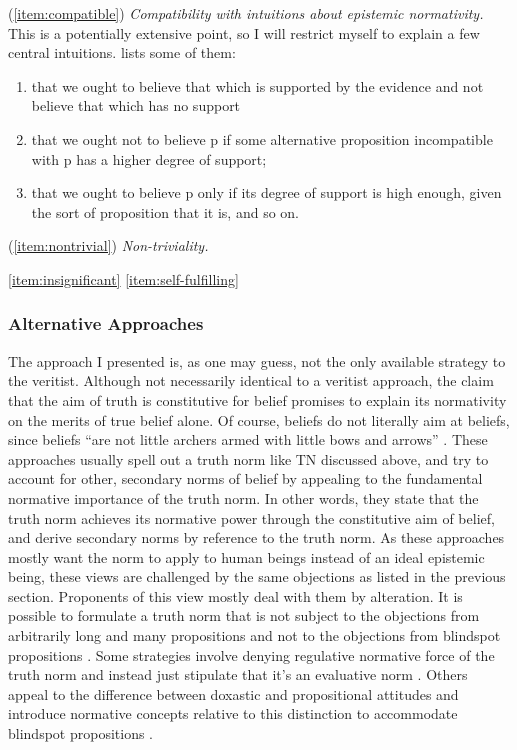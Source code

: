\documentclass[12pt,numbers=noenddot]{scrartcl}
\begin{document}
(\ref{item:compatible}) \emph{Compatibility with intuitions about epistemic normativity.}
This is a potentially extensive point, so I will restrict myself to explain a few central intuitions. \textcite[39]{Boghossian2003-BOGTNO} lists some of them: \begin{enumerate}[label=\alph*)]
    \itemsep-0.2em
    \item that we ought to believe that which is supported by the evidence and not believe that which has no support
    \item that we ought not to believe p if some alternative proposition incompatible with p has a higher degree of support;
    \item that we ought to believe p only if its degree of support is high enough, given the sort of proposition that it is, and so on.
\end{enumerate}

(\ref{item:nontrivial}) \emph{Non-triviality.}

\ref{item:insignificant}
\ref{item:self-fulfilling}


\subsubsection{Alternative Approaches}

The approach I presented is, as one may guess, not the only available strategy to the veritist. Although not necessarily identical to a veritist approach, the claim that the aim of truth is constitutive for belief promises to explain its normativity on the merits of true belief alone. Of course, beliefs do not literally aim at beliefs, since beliefs “are not little archers armed with little bows and arrows” \autocite[267]{Wedgwood2002-WEDTAO}. These approaches usually spell out a truth norm like TN discussed above, and try to account for other, secondary norms of belief by appealing to the fundamental normative importance of the truth norm. In other words, they state that the truth norm achieves its normative power through the constitutive aim of belief, and derive secondary norms by reference to the truth norm. As these approaches mostly want the norm to apply to human beings instead of an ideal epistemic being, these views are challenged by the same objections as listed in the previous section. Proponents of this view mostly deal with them by alteration. It is possible to formulate a truth norm that is not subject to the objections from arbitrarily long and many propositions \autocite[159]{David2001-DAVTAT-7} and not to the objections from blindspot propositions \autocite{Greenberg2016-GREITN}. Some strategies involve denying regulative normative force of the truth norm and instead just stipulate that it's an evaluative norm \autocite{Mchugh2012-MCHTTN}. Others appeal to the difference between doxastic and propositional attitudes and introduce normative concepts relative to this distinction to accommodate blindspot propositions \autocite{Wedgwood2013-WEDTRT}. 
\end{document}
